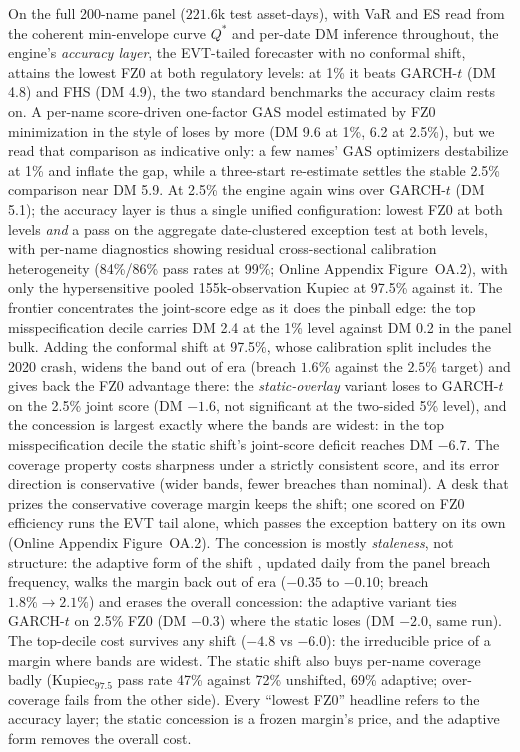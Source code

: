 \documentclass[11pt]{article}
\theoremstyle{remark}
\begin{document}
On the full 200-name
panel ($221.6$k test asset-days), with VaR and ES read from the
coherent min-envelope curve $Q^{*}$ and per-date DM inference
throughout, the engine's \emph{accuracy layer}, the EVT-tailed forecaster with no
conformal shift, attains the
lowest FZ0 at both regulatory levels: at 1\% it beats GARCH-$t$ (DM 4.8) and FHS (DM 4.9), the two standard
benchmarks the accuracy claim rests on. A per-name score-driven
one-factor GAS model estimated by FZ0 minimization in the style of
\citet{patton2019} loses by more (DM 9.6 at 1\%, 6.2 at 2.5\%), but we
read that comparison as indicative only: a few names' GAS optimizers
destabilize at 1\% and inflate the gap, while a three-start re-estimate
settles the stable 2.5\% comparison near DM 5.9. At 2.5\% the engine
again wins over GARCH-$t$ (DM 5.1); the accuracy layer is thus a single
unified configuration: lowest FZ0 at both
levels \emph{and} a pass on the aggregate date-clustered exception
test at both levels, with per-name diagnostics showing residual
cross-sectional calibration heterogeneity (84\%/86\% pass rates at
99\%; Online Appendix Figure~OA.2),
with only the hypersensitive pooled 155k-observation Kupiec at 97.5\%
against it. The frontier concentrates the joint-score
edge as it does the pinball edge: the top misspecification decile
carries DM 2.4 at the 1\% level against DM 0.2 in the panel bulk.
Adding the conformal shift at 97.5\%, whose calibration split includes
the 2020 crash, widens the band out of era (breach $1.6\%$ against the $2.5\%$ target) and gives
back the FZ0 advantage there: the \emph{static-overlay} variant loses to
GARCH-$t$ on the 2.5\% joint score (DM $-1.6$, not significant at
the two-sided 5\% level), and the concession is largest exactly where
the bands are widest: in the top misspecification decile the
static shift's joint-score deficit reaches DM $-6.7$. The coverage
property costs sharpness under
a strictly consistent score, and its error direction is conservative
(wider bands, fewer breaches than nominal). A desk that prizes the
conservative coverage margin keeps the shift; one scored on FZ0
efficiency
runs the EVT tail alone, which passes the exception battery on its
own (Online Appendix Figure~OA.2). The concession is
mostly \emph{staleness}, not structure: the adaptive form of the
shift \citep{gibbs2021aci}, updated daily from the panel breach
frequency, walks the margin back out of era ($-0.35$ to $-0.10$;
breach $1.8\%\to2.1\%$) and erases the overall concession: the
adaptive variant ties GARCH-$t$ on 2.5\% FZ0 (DM $-0.3$) where the
static loses (DM $-2.0$, same run). The top-decile cost survives any
shift ($-4.8$ vs $-6.0$): the irreducible price of a margin where
bands are widest. The static shift also buys per-name coverage badly
(Kupiec$_{97.5}$ pass rate 47\% against 72\% unshifted, 69\%
adaptive; over-coverage fails from the other side). Every
``lowest FZ0'' headline refers to the accuracy layer; the static
concession is a frozen margin's price, and the adaptive form removes
the overall cost.
\end{document}
